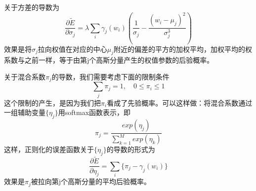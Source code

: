 关于方差的导数为
\begin{equation}
	\frac{\partial \tilde{E}}{\partial \sigma_j}=\lambda\sum_i\gamma_j(w_i)\left(\frac{1}{\sigma_j}-\frac{(w_i-\mu_j)^2}{\sigma_j^3} \right)
\end{equation}
效果是将$\sigma_j$拉向权值在对应的中心$\mu_j$附近的偏差的平方的加权平均，加权平均的权系数与之前一样，等于由第j个高斯分量产生的权值参数的后验概率。

关于混合系数$\pi_j$的导数，我们需要考虑下面的限制条件 
\begin{equation}
	\sum_{j}\pi_j=1,\quad 0\leqslant \pi_i \leqslant 1
\end{equation}
这个限制的产生，是因为我们把$\pi_i$看成了先验概率。可以这样做：将混合系数通过一组辅助变量$\{\eta_j \}$用softmax函数表示，即
\begin{equation}
	\pi_j=\frac{exp(\eta_j)}{\sum_{k=1}^{M}exp(\eta_k)}
\end{equation}
这样，正则化的误差函数关于$\{\eta_j \}$的导数的形式为
\begin{equation}
	\frac{\partial \tilde{E}}{\partial \eta_j}=\sum_i\{\pi_j-\gamma_j(w_i) \}
\end{equation}
效果是$\pi_j$被拉向第j个高斯分量的平均后验概率。